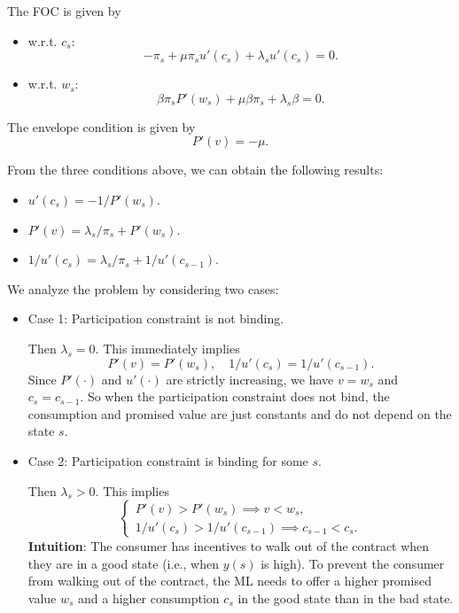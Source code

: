 The FOC is given by
\begin{itemize}
    \item w.r.t. $c_s$:
    \[
    -\pi_s + \mu \pi_s u'(c_s) + \lambda_s u'(c_s) = 0.
    \]
    \item w.r.t. $w_s$:
    \[
    \beta \pi_s P'(w_s) + \mu \beta \pi_s + \lambda_s \beta = 0.
    \]
\end{itemize}

The envelope condition is given by
\[
    P'(v) = -\mu.
\]

From the three conditions above, we can obtain the following results:
\begin{itemize}
    \item $u'(c_s) = -1/P'(w_s)$.
    \item $P'(v) = \lambda_s/\pi_s+P'(w_s)$.
    \item $1/u'(c_s) = \lambda_s/\pi_s+1/u'(c_{s-1})$.
\end{itemize} 

We analyze the problem by considering two cases:
\begin{itemize}
    \item Case 1: Participation constraint is not binding.
    
    Then $\lambda_s = 0$. This immediately implies 
    \[
    P'(v) = P'(w_s), \quad 1/u'(c_s) = 1/u'(c_{s-1}).
    \]
    Since $P'(\cdot)$ and $u'(\cdot)$ are strictly increasing, we have $v = w_s$ and $c_s = c_{s-1}$. So when the participation constraint does not bind, the consumption and promised value are just constants and do not depend on the state $s$.
    \item Case 2: Participation constraint is binding for some $s$.
    
    Then $\lambda_{s}>0$. This implies
    \[
    \begin{cases}
        P'(v) > P'(w_s) \implies v<w_s,\\
        1/u'(c_s) > 1/u'(c_{s-1}) \implies c_{s-1}<c_s.
    \end{cases}
    \]
    \textbf{Intuition}: The consumer has incentives to walk out of the contract when they are in a good state (i.e., when $y(s)$ is high). To prevent the consumer from walking out of the contract, the ML needs to offer a higher promised value $w_s$ and a higher consumption $c_s$ in the good state than in the bad state.
\end{itemize}

